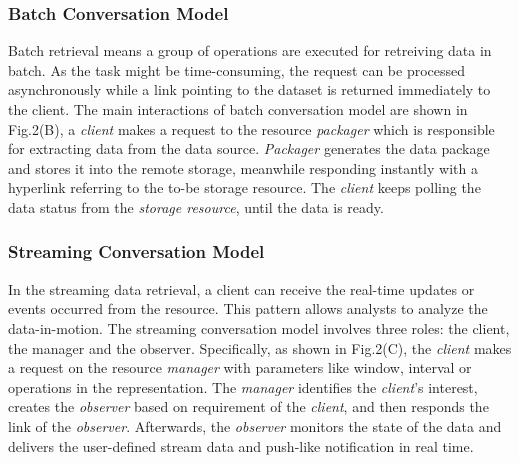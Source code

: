 \documentclass[10pt, conference, compsocconf]{IEEEtran}
\begin{document}
\subsubsection{Batch Conversation Model}
Batch retrieval means a group of operations are executed for retreiving data in batch. As the task might be time-consuming, the request can be processed asynchronously while a link pointing to the dataset is returned immediately to the client. The main interactions of batch conversation model are shown in Fig.2(B), a \textit{client} makes a request to the resource \textit{packager} which is responsible for extracting data from the data source. \textit{Packager} generates the data package and stores it into the remote storage, meanwhile responding instantly with a hyperlink referring to the to-be storage resource. The \textit{client} keeps polling the data status from the \textit{storage resource}, until the data is ready.

\subsubsection{Streaming Conversation Model}
In the streaming data retrieval, a client can receive the real-time updates or events occurred from the resource. This pattern allows analysts to analyze the data-in-motion. The streaming conversation model involves three roles: the client, the manager and the observer. Specifically, as shown in Fig.2(C), the \textit{client} makes a request on the resource \textit{manager} with parameters like window, interval or operations in the representation. The \textit{manager} identifies the \textit{client}’s interest, creates the \textit{observer} based on requirement of the \textit{client}, and then responds the link of the \textit{observer}. Afterwards, the \textit{observer} monitors the state of the data and delivers the user-defined stream data and push-like notification in real time.
\end{document}
